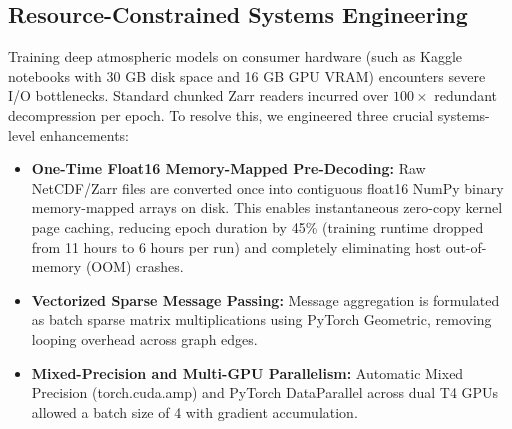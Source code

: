 \subsection{Resource-Constrained Systems Engineering}
Training deep atmospheric models on consumer hardware (such as Kaggle notebooks with 30 GB disk space and 16 GB GPU VRAM) encounters severe I/O bottlenecks. Standard chunked Zarr readers incurred over $100\times$ redundant decompression per epoch. To resolve this, we engineered three crucial systems-level enhancements:
\begin{itemize}
    \item \textbf{One-Time Float16 Memory-Mapped Pre-Decoding:} Raw NetCDF/Zarr files are converted once into contiguous float16 NumPy binary memory-mapped arrays on disk. This enables instantaneous zero-copy kernel page caching, reducing epoch duration by 45\% (training runtime dropped from 11 hours to 6 hours per run) and completely eliminating host out-of-memory (OOM) crashes.
    \item \textbf{Vectorized Sparse Message Passing:} Message aggregation is formulated as batch sparse matrix multiplications using PyTorch Geometric, removing looping overhead across graph edges.
    \item \textbf{Mixed-Precision and Multi-GPU Parallelism:} Automatic Mixed Precision (torch.cuda.amp) and PyTorch DataParallel across dual T4 GPUs allowed a batch size of 4 with gradient accumulation.
\end{itemize}

